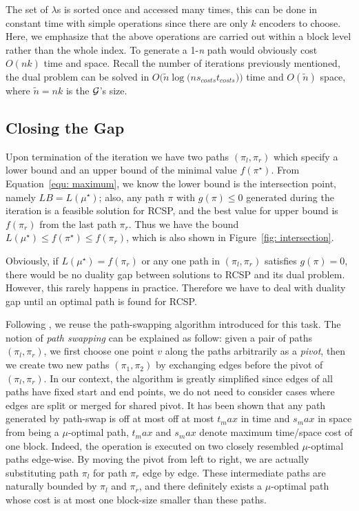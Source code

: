 \documentclass{sig-alternate-05-2015}
\begin{document}
The set of $ \lambda $s is sorted once and accessed many times, this can be done in constant time with simple operations since there are only $ k $ encoders to choose.
Here, we emphasize that the above operations are carried out within a block level rather than the whole index.
To generate a 1-\textit{n} path would obviously cost $ O(nk) $ time and space.
Recall the number of iterations previously mentioned, the dual problem can be solved in $ O(\tilde{n} $$ \log(n$$ s_{costs} $$ t_{costs})) $ time and $ O(\tilde{n}) $ space, where $ \tilde{n} = nk $ is the $ \cal G $'s size.

\subsection{Closing the Gap}
Upon termination of the iteration we have two paths $ (\pi_l,\pi_r) $ which specify a lower bound and an upper bound of the minimal value $ f(\pi^\star) $.
From Equation~\eqref{equ: maximum}, we know the lower bound is the intersection point, namely $ LB =  L(\mu^\star) $; also, any path $ \pi $ with $ g(\pi) \leqslant 0 $ generated during the iteration is a feasible solution for RCSP, and the best value for upper bound is $ f(\pi_r) $ from the last path $ \pi_r $.
Thus we have the bound $ L(\mu^\star) \leqslant f(\pi^\star) \leqslant f(\pi_r) $, which is also shown in Figure~\ref{fig: intersection}.

Obviously, if $ L(\mu^\star) = f(\pi_r) $ or any one path in $ (\pi_l,\pi_r) $ satisfies $ g(\pi) = 0 $, there would be no duality gap between solutions to RCSP and its dual problem.
However, this rarely happens in practice.
Therefore we have to deal with duality gap until an optimal path is found for RCSP.

Following \cite{farruggia2014bicriteria}, we reuse the path-swapping algorithm introduced for this task.
The notion of \textit{path swapping} can be explained as follow: given a pair of paths $ (\pi_l,\pi_r) $, we first choose one point $ v $ along the paths arbitrarily as a \textit{pivot}, then we create two new paths $ (\pi_1,\pi_2) $ by exchanging edges before the pivot of $ (\pi_l,\pi_r) $.
In our context, the algorithm is greatly simplified since edges of all paths have fixed start and end points, we do not need to consider cases where edges are split or merged for shared pivot.
It has been shown that any path generated by path-swap is off at most off at most $ t_max $ in time and $ s_max $ in space from being a $ \mu $-optimal path, $ t_max $ and $ s_max $ denote maximum time/space cost of one block.
Indeed, the operation is executed on two closely resembled $ \mu $-optimal paths edge-wise.
By moving the pivot from left to right, we are actually substituting path $ \pi_l $ for path $ \pi_r $ edge by edge.
These intermediate paths are naturally bounded by $ \pi_l $ and $ \pi_r $, and there definitely exists a $ \mu $-optimal path whose cost is at most one block-size smaller than these paths.
\end{document}
